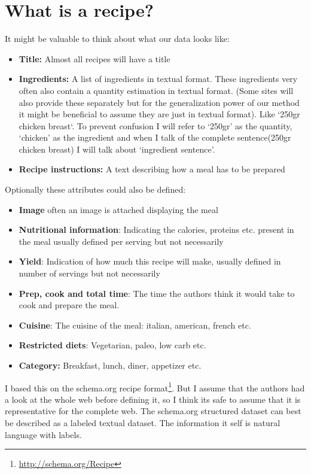 \documentclass[a4paper]{scrartcl}
\begin{document}
\section{What is a recipe?}
It might be valuable to think about what our data looks like: 
\begin{itemize}
\item \textbf{Title:} Almost all recipes will have a title
\item \textbf{Ingredients:} A list of ingredients in textual format. These ingredients very often also contain a quantity estimation in textual format. (Some sites will also provide these separately but for the generalization power of our method it might be beneficial to assume they are just in textual format). Like `250gr chicken breast`. To prevent confusion I will refer to `250gr' as the quantity, `chicken' as the ingredient and when I talk of the complete sentence(250gr chicken breast) I will talk about `ingredient sentence'.
\item \textbf{Recipe instructions:} A text describing how a meal has to be prepared  
\end{itemize}
Optionally these attributes could also be defined:
\begin{itemize}
\item \textbf{Image} often an image is attached displaying the meal
\item \textbf{Nutritional information}: Indicating the calories, proteins etc. present in the meal usually defined per serving but not necessarily
\item \textbf{Yield}: Indication of how much this recipe will make, usually defined in number of servings but not necessarily
\item \textbf{Prep, cook and total time}: The time the authors think it would take to cook and prepare the meal.
\item \textbf{Cuisine}: The cuisine of the meal: italian, american, french etc. 
\item \textbf{Restricted diets}: Vegetarian, paleo, low carb  etc.
\item \textbf{Category:} Breakfast, lunch, diner, appetizer etc. 
\end{itemize}
I based this on the schema.org recipe format\footnote{\url{http://schema.org/Recipe}}. But I assume that the authors had a look at the whole web before defining it, so I think its safe to assume that it is representative for the complete web. The schema.org structured dataset can best be described as a labeled textual dataset. The information it self is natural language with labels.  
\end{document}
